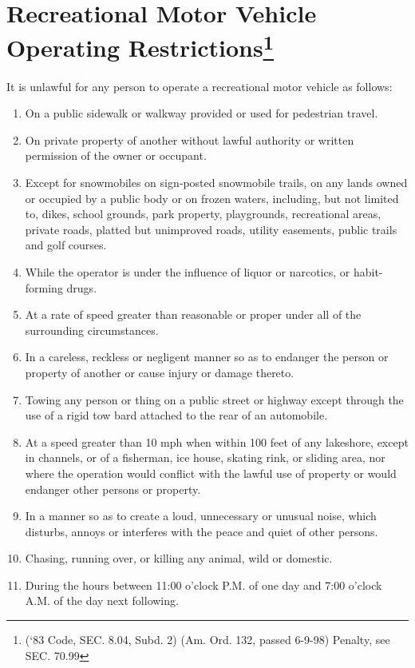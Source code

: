 \section{Recreational Motor Vehicle Operating Restrictions\footnote{(‘83 Code, SEC. 8.04, Subd. 2) (Am. Ord. 132, passed 6-9-98) Penalty, see SEC. 70.99}}
It is unlawful for any person to operate a recreational motor vehicle as follows:
\begin{enumerate}[{\indent}A)]
    \item On a public sidewalk or walkway provided or used for pedestrian travel.
    \item On private property of another without lawful authority or written permission of the owner or occupant.
    \item Except for snowmobiles on sign‑posted snowmobile trails, on any lands owned or occupied by a public body or on frozen waters, including, but not limited to, dikes, school grounds, park property, playgrounds, recreational areas, private roads, platted but unimproved roads, utility easements, public trails and golf courses.
    \item While the operator is under the influence of liquor or narcotics, or habit-forming drugs.
    \item At a rate of speed greater than reasonable or proper under all of the surrounding circumstances.
    \item In a careless, reckless or negligent manner so as to endanger the person or property of another or cause injury or damage thereto.
    \item Towing any person or thing on a public street or highway except through the use of a rigid tow bard attached to the rear of an automobile.
    \item At a speed greater than 10 mph when within 100 feet of any lakeshore, except in channels, or of a fisherman, ice house, skating rink, or sliding area, nor where the operation would conflict with the lawful use of property or would endanger other persons or property.
    \item In a manner so as to create a loud, unnecessary or unusual noise, which disturbs, annoys or interferes with the peace and quiet of other persons.
    \item Chasing, running over, or killing any animal, wild or domestic.
    \item During the hours between 11:00 o'clock P.M. of one day and 7:00 o'clock A.M. of the day next following.
\end{enumerate}

